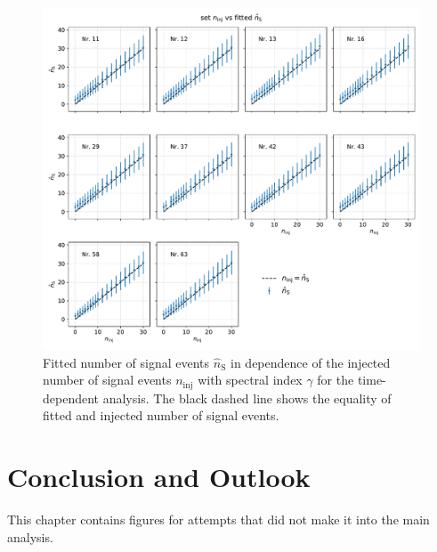 \begin{figure}
    \centering
    \includegraphics[width=\linewidth]{Plots/appendix/ns_fit_time_dep.pdf}
    \caption{Fitted number of signal events $\hat{n}_{\text{S}}$ in dependence of the injected number of signal events $n_\text{inj}$ with spectral index $\gamma$ for the time-dependent analysis. The black dashed line shows the equality of fitted and injected number of signal events.}
    \label{fig:ns_fit_time_dep}
\end{figure}

\section{Conclusion and Outlook}

This chapter contains figures for attempts that did not make it into the main analysis.


